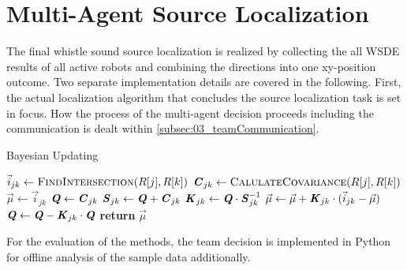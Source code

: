 \section{Multi-Agent Source Localization}
\label{sec:03_multiAgentLoca}

The final whistle sound source localization is realized by collecting the
all \ac{WSDE} results of all active robots and combining the directions
into one xy-position outcome.
Two separate implementation details are covered in the following.
First, the actual localization algorithm that concludes the source localization
task is set in focus.
How the process of the multi-agent decision proceeds including the communication
is dealt within \cref{subsec:03_teamCommunication}.


\begin{algorithm}[H]
    \caption{Bayesian Updating}\label{alg:03_multiAgentLoca}
    \begin{algorithmic}[1]
                    \State $\vec{i}_{jk} \gets \Call{FindIntersection}{R[j], R[k]}$
                    \State $\textbf{\textit{C}}_{jk} \gets \Call{CalulateCovariance}{R[j], R[k]}$
                        \State $\vec{\mu} \gets \vec{i}_{jk}$
                        \State $\textbf{\textit{Q}} \gets \textbf{\textit{C}}_{jk}$
                        \State $\textbf{\textit{S}}_{jk} \gets \textbf{\textit{Q}} + \textbf{\textit{C}}_{jk}$
                        \State $\textbf{\textit{K}}_{jk} \gets \textbf{\textit{Q}} \cdot \textbf{\textit{S}}_{jk}^{-1}$
                        \State $\vec{\mu} \gets \vec{\mu} + \textbf{\textit{K}}_{jk} \cdot (\vec{i}_{jk} - \vec{\mu})$
                        \State $\textbf{\textit{Q}} \gets \textbf{\textit{Q}} - \textbf{\textit{K}}_{jk} \cdot \textbf{\textit{Q}}$
                    \EndIf
                \EndFor
            \EndFor
            \State \textbf{return} $\vec{\mu}$
        \EndProcedure\vspace{12pt}
    \end{algorithmic}
\end{algorithm}


For the evaluation of the methods, the team decision is implemented in
Python for offline analysis of the sample data additionally.

